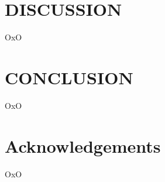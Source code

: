 \documentclass[10.7pt,]{article}
\begin{document}
\section{DISCUSSION}\label{discussion}
%
OxO
%
%
%
\section{CONCLUSION}\label{conclusion}
%
OxO
%
%
%
\section{Acknowledgements}\label{acknowledgements}
%
OxO
%
%
%


\end{document}
